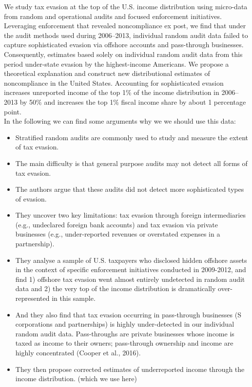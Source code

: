 \documentclass[11pt]{article}
\begin{document}
\noindent We study tax evasion at the top of the U.S. income distribution using micro-data from random and operational audits and focused enforcement initiatives. Leveraging enforcement that revealed noncompliance ex post, we find that under the audit methods used during 2006–2013, individual random audit data failed to capture sophisticated evasion via offshore accounts and pass-through businesses. Consequently, estimates based solely on individual random audit data from this period under-state evasion by the highest-income Americans. We propose a theoretical explanation and construct new distributional estimates of noncompliance in the United States. Accounting for sophisticated evasion increases unreported income of the top 1\% of the income distribution in 2006–2013 by 50\% and increases the top 1\% fiscal income share by about 1 percentage point.
\vspace{0.5em} \\
\noindent In the following we can find some arguments why we we should use this data: 
\begin{itemize}
    \item Stratified random audits are commonly used to study and measure the extent of tax evasion. 
    \item The main difficulty is that general purpose audits may not detect all forms of tax evasion.
    \item The authors argue that these audits did not detect more sophisticated types of evasion. 
    \item They uncover two key limitations: tax evasion through foreign intermediaries (e.g., undeclared foreign bank accounts) and tax evasion via private businesses (e.g., under-reported revenues or overstated expenses in a partnership). 
    \item They analyse a sample of U.S. taxpayers who disclosed hidden offshore assets in the context of specific enforcement initiatives conducted in 2009-2012, and find 1) offshore tax evasion went almost entirely undetected in random audit data and 2) the very top of the income distribution is dramatically over-represented in this sample. 
    \item And they also find that tax evasion occurring in pass-through businesses (S corporations and partnerships) is highly under-detected in our individual random audit data. Pass-throughs are private businesses whose income is taxed as income to their owners; pass-through ownership and income are highly concentrated (Cooper et al., 2016).
    \item They then propose corrected estimates of underreported income through the income distribution. (which we use here)
\end{itemize}
\end{document}
